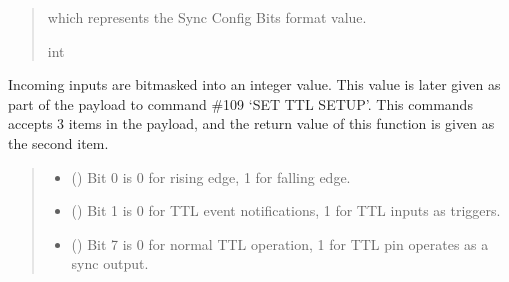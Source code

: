 \documentclass[letterpaper,10pt,english]{sphinxmanual}
\begin{document}
\begin{fulllineitems}
\begin{fulllineitems}
\begin{quote}
\begin{description}
\begin{itemize}
\end{itemize}

\sphinxAtStartPar
which represents the Sync Config Bits format value.

\sphinxAtStartPar
int

\end{description}\end{quote}

\end{fulllineitems}


\begin{fulllineitems}
\label{\detokenize{PodApi.Devices:PodApi.Devices.PodDevice_8480SC.Pod8480SC.TtlConfigBits}}
\pysigstartsignatures
{}
\pysigstopsignatures
\sphinxAtStartPar
Incoming inputs are bitmasked into an integer value. This value is later given as part of the payload to         command \#109 ‘SET TTL SETUP’. This commands accepts 3 items in the payload, and the return value of this function         is given as the second item.
\begin{quote}\begin{description}
\begin{itemize}
\item {} 
\sphinxAtStartPar
{} () \textendash{} Bit 0 is 0 for rising edge, 1 for falling edge.

\item {} 
\sphinxAtStartPar
{} () \textendash{} Bit 1 is  0 for TTL event notifications, 1 for TTL inputs as triggers.

\item {} 
\sphinxAtStartPar
{} () \textendash{} Bit 7 is 0 for normal TTL operation, 1 for TTL pin operates as a sync output.


\end{itemize}
\end{description}
\end{quote}
\end{fulllineitems}
\end{fulllineitems}
\end{document}

